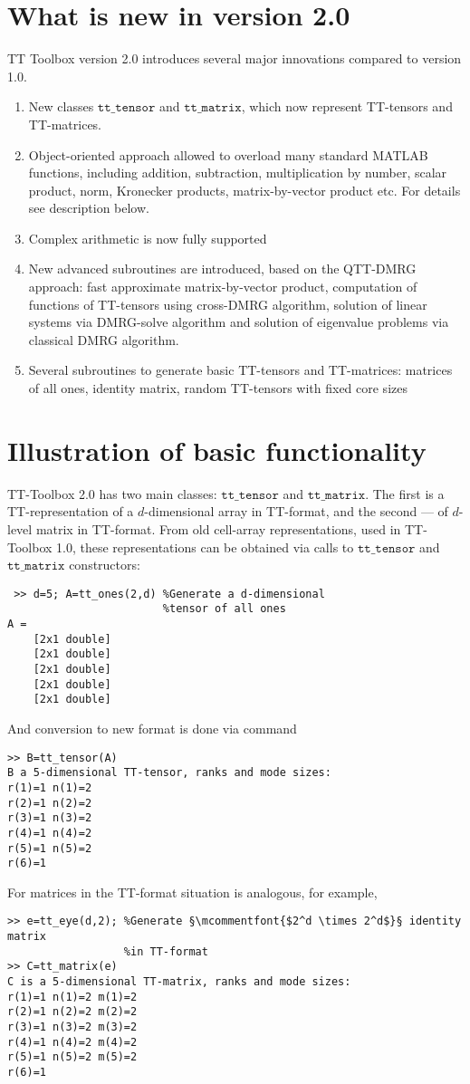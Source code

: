 \documentclass[a4paper,12pt,twoside]{article}
\def\tt{\texttt{tt\_tensor}}
\def\ttm{\texttt{tt\_matrix}}
\begin{document}
\section{What is new in version 2.0}
  TT Toolbox version 2.0 introduces several major innovations compared to version 1.0. \\
  \begin{enumerate}
  \item New classes $\tt$ and $\ttm$, which now represent TT-tensors and TT-matrices.
  \item Object-oriented approach allowed to overload many standard MATLAB functions, including addition, subtraction, 
  multiplication by number, scalar product, norm, Kronecker products, matrix-by-vector product etc. For details
 see description below.
  \item Complex arithmetic is now fully supported 
\item New advanced subroutines are introduced, based on the QTT-DMRG approach: fast approximate matrix-by-vector
product, computation of functions of TT-tensors using cross-DMRG algorithm, solution of linear systems via
  DMRG-solve algorithm and solution of eigenvalue problems via classical DMRG algorithm. 
 \item Several subroutines to generate basic TT-tensors and TT-matrices: matrices of all ones, identity matrix,
 random TT-tensors with fixed core sizes 
 \end{enumerate}
\section{Illustration of basic functionality}

TT-Toolbox 2.0 has two main classes: $\tt$ and $\ttm$. 
The first is a TT-representation of a $d$-dimensional array in TT-format, and the second --- of $d$-level 
matrix in TT-format. From  old cell-array representations, used in TT-Toolbox 1.0, 
these representations can be obtained via calls to $\tt$ and $\ttm$ constructors:


%

\begin{lstlisting}
 >> d=5; A=tt_ones(2,d) %Generate a d-dimensional 
                        %tensor of all ones
A = 
    [2x1 double]
    [2x1 double]
    [2x1 double]
    [2x1 double]
    [2x1 double]
\end{lstlisting}
And conversion to new format is done via command
\begin{lstlisting}
>> B=tt_tensor(A)
B a 5-dimensional TT-tensor, ranks and mode sizes: 
r(1)=1 n(1)=2
r(2)=1 n(2)=2
r(3)=1 n(3)=2
r(4)=1 n(4)=2
r(5)=1 n(5)=2
r(6)=1   
\end{lstlisting}
For matrices in the TT-format situation is analogous, for example,
\begin{lstlisting}
>> e=tt_eye(d,2); %Generate §\mcommentfont{$2^d \times 2^d$}§ identity matrix 
                  %in TT-format
>> C=tt_matrix(e)
C is a 5-dimensional TT-matrix, ranks and mode sizes: 
r(1)=1 n(1)=2 m(1)=2
r(2)=1 n(2)=2 m(2)=2
r(3)=1 n(3)=2 m(3)=2
r(4)=1 n(4)=2 m(4)=2
r(5)=1 n(5)=2 m(5)=2
r(6)=1     
\end{lstlisting}
\end{document}
